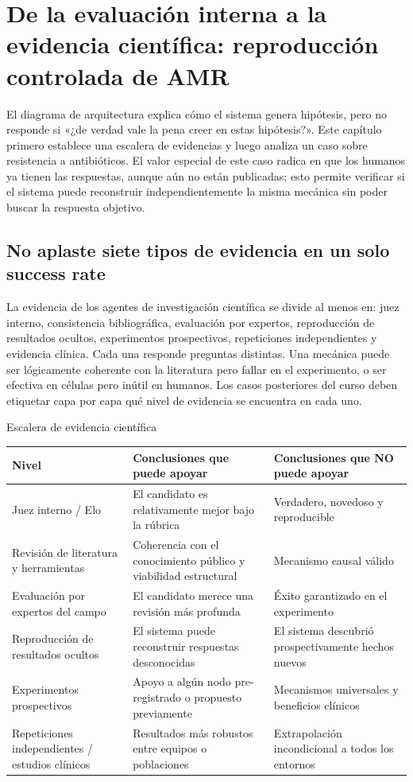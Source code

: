 \section{De la evaluación interna a la evidencia científica: reproducción controlada de AMR}

El diagrama de arquitectura explica cómo el sistema genera hipótesis, pero no responde si «¿de verdad vale la pena creer en estas hipótesis?». Este capítulo primero establece una escalera de evidencias y luego analiza un caso sobre resistencia a antibióticos. El valor especial de este caso radica en que los humanos ya tienen las respuestas, aunque aún no están publicadas; esto permite verificar si el sistema puede reconstruir independientemente la misma mecánica sin poder buscar la respuesta objetivo.

\subsection{No aplaste siete tipos de evidencia en un solo success rate}

La evidencia de los agentes de investigación científica se divide al menos en: juez interno, consistencia bibliográfica, evaluación por expertos, reproducción de resultados ocultos, experimentos prospectivos, repeticiones independientes y evidencia clínica. Cada una responde preguntas distintas. Una mecánica puede ser lógicamente coherente con la literatura pero fallar en el experimento, o ser efectiva en células pero inútil en humanos. Los casos posteriores del curso deben etiquetar capa por capa qué nivel de evidencia se encuentra en cada uno.

\begin{importantbox}{Escalera de evidencia científica}
\begin{tabularx}{\textwidth}{L{0.22\textwidth}X X}
\toprule
Nivel & Conclusiones que puede apoyar & Conclusiones que NO puede apoyar \\
\midrule
Juez interno / Elo & El candidato es relativamente mejor bajo la rúbrica & Verdadero, novedoso y reproducible \\
Revisión de literatura y herramientas & Coherencia con el conocimiento público y viabilidad estructural & Mecanismo causal válido \\
Evaluación por expertos del campo & El candidato merece una revisión más profunda & Éxito garantizado en el experimento \\
Reproducción de resultados ocultos & El sistema puede reconstruir respuestas desconocidas & El sistema descubrió prospectivamente hechos nuevos \\
Experimentos prospectivos & Apoyo a algún nodo pre-registrado o propuesto previamente & Mecanismos universales y beneficios clínicos \\
Repeticiones independientes / estudios clínicos & Resultados más robustos entre equipos o poblaciones & Extrapolación incondicional a todos los entornos \\
\bottomrule
\end{tabularx}
\end{importantbox}

